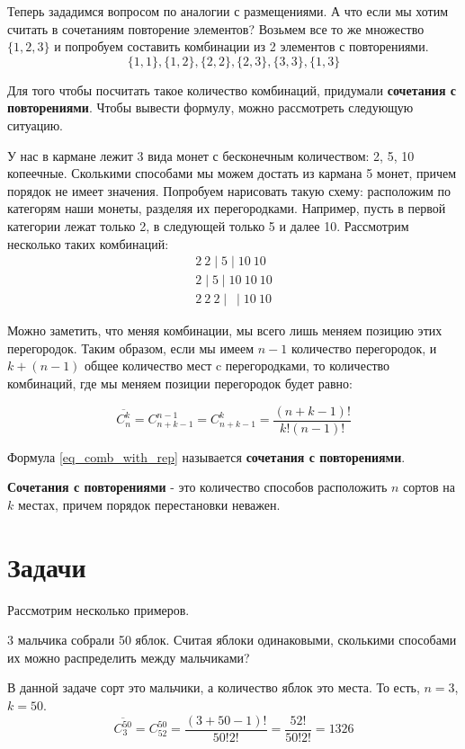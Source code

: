 Теперь зададимся вопросом по аналогии с размещениями. А что если мы хотим считать в сочетаниям повторение
элементов? Возьмем все то же множество $\{1, 2, 3\}$ и попробуем составить комбинации
из 2 элементов с повторениями.
\begin{equation}
    \{1, 1\}, \{1, 2\}, \{2, 2\}, \{2, 3\}, \{3, 3\}, \{1, 3\}
\end{equation}

Для того чтобы посчитать такое количество комбинаций, придумали 
\textbf{сочетания с повторениями}. Чтобы вывести формулу, можно рассмотреть следующую
ситуацию.

У нас в кармане лежит 3 вида монет с бесконечным количеством: 2, 5, 10 копеечные.
Сколькими способами мы можем достать из кармана 5 монет, причем порядок не имеет значения.
Попробуем нарисовать такую схему: расположим по категорям наши монеты, разделяя их перегородками.
Например, пусть в первой категории лежат только 2, в следующей только 5 и далее 10. Рассмотрим несколько
таких комбинаций:
\begin{gather*}
    2 \ 2 \mid 5 \mid 10 \ 10  \\
    2  \mid 5 \mid 10 \ 10 \ 10 \\
    2 \ 2 \ 2 \mid  \ \mid 10 \ 10 
\end{gather*} 

Можно заметить, что меняя комбинации, мы всего лишь меняем позицию этих перегородок.
Таким образом, если мы имеем $n - 1$ количество перегородок, и $k + (n - 1)$ 
общее количество мест c перегородками, то количество комбинаций, где мы меняем позиции перегородок будет равно:

\begin{equation}\label{eq_comb_with_rep}
    \overline {C^k_n} = C^{n - 1}_{n + k - 1} = C^{k}_{n + k - 1} = \frac{(n + k - 1)!}{k!(n-1)!}
\end{equation}

Формула \ref{eq_comb_with_rep} называется \textbf{сочетания с повторениями}.
\begin{utv}
    \textbf{Сочетания с повторениями} - это количество способов расположить $n$ сортов на $k$ местах,
    причем порядок перестановки неважен.
\end{utv}


\section{Задачи}
Рассмотрим несколько примеров.
\begin{task}
    3 мальчика собрали 50 яблок. Считая яблоки одинаковыми, сколькими способами
    их можно распределить между мальчиками?
    \begin{solution}
        В данной задаче сорт это мальчики, а количество яблок это места. То есть, $n = 3$, $k = 50$.
        \begin{equation*}
            \overline {C^{50}_3} = C^{50}_{52} = \frac{(3+50-1)!}{50!2!} = \frac{52!}{50!2!} = 1326
        \end{equation*}
    \end{solution}
\end{task}

